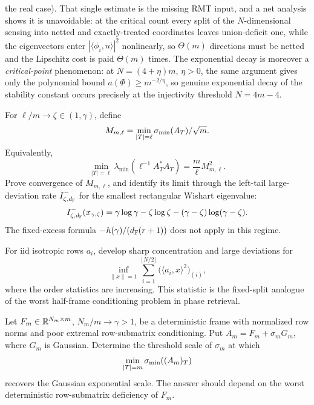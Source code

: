 \begin{problem}
the real case).  That single estimate is the missing RMT input, and a net analysis shows it is
unavoidable: at the critical count every split of the \(N\)-dimensional sensing into netted and
exactly-treated coordinates leaves union-deficit one, while the eigenvectors enter
\(|\langle\phi_i,u\rangle|^2\) nonlinearly, so \(\Theta(m)\) directions must be netted and the
Lipschitz cost is paid \(\Theta(m)\) times.  The exponential decay is moreover a \emph{critical-point}
phenomenon: at \(N=(4+\eta)m\), \(\eta>0\), the same argument gives only the polynomial bound
\(a(\Phi)\ge m^{-2/\eta}\), so genuine exponential decay of the stability constant occurs precisely at
the injectivity threshold \(N=4m-4\).
\end{problem}

\begin{problem}\label{prob:rectangular}
For \(\ell/m\to\zeta\in(1,\gamma)\), define
\[
  M_{m,\ell}=\min_{|T|=\ell}\sigma_{\min}(A_T)/\sqrt m.
\]
Equivalently,
\[
  \min_{|T|=\ell}
  \lambda_{\min}\!\left(\ell^{-1}A_T^*A_T\right)
  =\frac{m}{\ell}M_{m,\ell}^2 .
\]
Prove convergence of \(M_{m,\ell}\), and identify its limit through the
left-tail large-deviation rate \(I^-_{\zeta,d_{\mathbb{F}}}\) for the smallest rectangular
Wishart eigenvalue:
\[
  I^-_{\zeta,d_{\mathbb{F}}}(x_{\gamma,\zeta})=
  \gamma\log\gamma-\zeta\log\zeta-(\gamma-\zeta)\log(\gamma-\zeta).
\]
The fixed-excess formula \(-h(\gamma)/(d_{\mathbb{F}}(r+1))\) does not apply in this
regime.
\end{problem}

\begin{problem}\label{prob:trimmed}
For iid isotropic rows \(a_i\), develop sharp concentration and large
deviations for
\[
  \inf_{\|x\|=1}\sum_{i=1}^{\lfloor N/2\rfloor}
  \bigl(\langle a_i,x\rangle^2\bigr)_{(i)},
\]
where the order statistics are increasing.  This statistic is the fixed-split
analogue of the worst half-frame conditioning problem in phase retrieval.
\end{problem}

\begin{problem}\label{prob:smoothed}
Let \(F_m\in\mathbb{R}^{N_m\times m}\), \(N_m/m\to\gamma>1\), be a deterministic frame
with normalized row norms and poor extremal row-submatrix conditioning.  Put
\(A_m=F_m+\sigma_m G_m\), where \(G_m\) is Gaussian.  Determine the threshold
scale of \(\sigma_m\) at which
\[
  \min_{|T|=m}\sigma_{\min}((A_m)_T)
\]
recovers the Gaussian exponential scale.  The answer should depend on the
worst deterministic row-submatrix deficiency of \(F_m\).
\end{problem}

